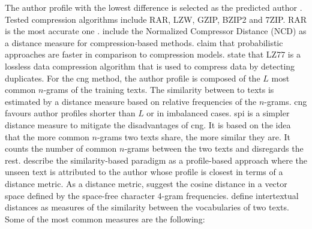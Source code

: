 The author profile with the lowest difference is selected as the predicted author \citep{stamatatos_survey_2009,elmanarelbouanani_authorship_2014}.
Tested compression algorithms include RAR, LZW, GZIP, BZIP2 and 7ZIP. 
RAR is the most accurate one \citep{elmanarelbouanani_authorship_2014}.
\citet{elmanarelbouanani_authorship_2014} include the Normalized Compressor Distance (NCD) as a distance measure for compression-based methods. %
\citet{stamatatos_survey_2009} claim that probabilistic approaches are faster in comparison to compression models.
\citet{neal_surveying_2018} state that LZ77 is a lossless data compression algorithm that is used to compress data by detecting duplicates.
For the \ac{cng} method, the author profile is composed of the $L$ most common $n$-grams of the training texts.
The similarity between to texts is estimated by a distance measure based on relative frequencies of the $n$-grams.
\ac{cng} favours author profiles shorter than $L$ or in imbalanced cases.
\ac{spi} is a simpler distance measure to mitigate the disadvantages of \ac{cng}.
It is based on the idea that the more common $n$-grams two texts share, the more similar they are.
It counts the number of common $n$-grams between the two texts and disregards the rest.
\citep{koppel_authorship_2011} describe the similarity-based paradigm as a profile-based approach 
where the unseen text is attributed to the author whose profile is closest in terms of a distance metric.
As a distance metric, \citet{koppel_authorship_2011} suggest the cosine distance in a vector space 
defined by the space-free character 4-gram frequencies.
\citet{neal_surveying_2018} define intertextual distances as measures of the similarity between the vocabularies of two texts.
Some of the most common measures are the following:
